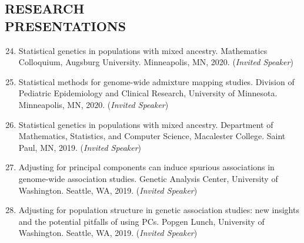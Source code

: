 \documentclass[margin]{res}
\newenvironment{benumerate}[1]{
    \let\oldItem\item
    \def\item{\addtocounter{enumi}{-2}\oldItem}
    
    \begin{enumerate}
    \setcounter{enumi}{#1}
    \addtocounter{enumi}{1}
}{
    \end{enumerate}
}
\begin{document}
\begin{resume}
\section{RESEARCH \\ PRESENTATIONS}

\begin{benumerate}{23} %
\item Statistical genetics in populations with mixed ancestry. Mathematics Colloquium, Augsburg University. Minneapolis, MN, 2020. (\textit{Invited Speaker})

\item Statistical methods for genome-wide admixture mapping studies. Division of Pediatric Epidemiology and Clinical Research, University of Minnesota. Minneapolis, MN, 2020. (\textit{Invited Speaker})

\item Statistical genetics in populations with mixed ancestry. Department of Mathematics, Statistics, and Computer Science, Macalester College. Saint Paul, MN, 2019. (\textit{Invited Speaker})


\item Adjusting for principal components can induce spurious associations in genome-wide association studies. Genetic Analysis Center, University of Washington. Seattle, WA, 2019. (\textit{Invited Speaker})

\item Adjusting for population structure in genetic association studies: new insights and the potential pitfalls of using PCs. Popgen Lunch, University of Washington. Seattle, WA, 2019.  (\textit{Invited Speaker})




\end{benumerate}
\end{resume}
\end{document}
